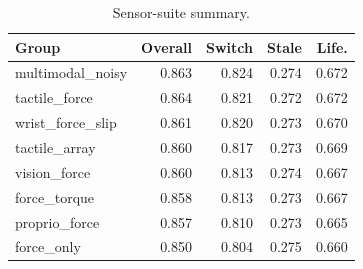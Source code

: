\begin{table}[t]
\centering
\caption{Sensor-suite summary.}
\label{tab:sensor-summary}
\small
\begin{tabular}{lrrrr}
\toprule
Group & Overall & Switch & Stale & Life. \\
\midrule
multimodal\_noisy & 0.863 & 0.824 & 0.274 & 0.672 \\
tactile\_force & 0.864 & 0.821 & 0.272 & 0.672 \\
wrist\_force\_slip & 0.861 & 0.820 & 0.273 & 0.670 \\
tactile\_array & 0.860 & 0.817 & 0.273 & 0.669 \\
vision\_force & 0.860 & 0.813 & 0.274 & 0.667 \\
force\_torque & 0.858 & 0.813 & 0.273 & 0.667 \\
proprio\_force & 0.857 & 0.810 & 0.273 & 0.665 \\
force\_only & 0.850 & 0.804 & 0.275 & 0.660 \\
\bottomrule
\end{tabular}
\end{table}
